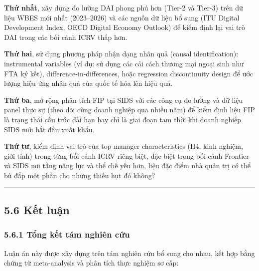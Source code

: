 \documentclass[12pt,a4paper]{article}
\begin{document}
\textbf{Thứ nhất}, xây dựng đo lường DAI phong phú hơn (Tier-2 và
Tier-3) trên dữ liệu WBES mới nhất (2023--2026) và các nguồn dữ liệu bổ
sung (ITU Digital Development Index, OECD Digital Economy Outlook) để
kiểm định lại vai trò DAI trong các bối cảnh ICRV thấp hơn.

\textbf{Thứ hai}, sử dụng phương pháp nhận dạng nhân quả (causal
identification): instrumental variables (ví dụ: sử dụng các cải cách
thương mại ngoại sinh như FTA ký kết), difference-in-differences, hoặc
regression discontinuity design để ước lượng hiệu ứng nhân quả của quốc
tế hóa lên hiệu quả.

\textbf{Thứ ba}, mở rộng phân tích FIP tại SIDS với các công cụ đo lường
và dữ liệu panel thực sự (theo dõi cùng doanh nghiệp qua nhiều năm) để
kiểm định liệu FIP là trạng thái cấu trúc dài hạn hay chỉ là giai đoạn
tạm thời khi doanh nghiệp SIDS mới bắt đầu xuất khẩu.

\textbf{Thứ tư}, kiểm định vai trò của top manager characteristics (H4,
kinh nghiệm, giới tính) trong từng bối cảnh ICRV riêng biệt, đặc biệt
trong bối cảnh Frontier và SIDS nơi tầng năng lực và thể chế yếu hơn,
liệu đặc điểm nhà quản trị có thể bù đắp một phần cho những thiếu hụt đó
không?

\begin{center}\rule{0.5\linewidth}{0.5pt}\end{center}

\hypertarget{56-kux1ebft-luux1eadn}{%
\subsection{5.6 Kết luận}\label{56-kux1ebft-luux1eadn}}

\hypertarget{561-tux1ed5ng-kux1ebft-tuxe1m-nghiuxean-cux1ee9u}{%
\subsubsection{5.6.1 Tổng kết tám nghiên
cứu}\label{561-tux1ed5ng-kux1ebft-tuxe1m-nghiuxean-cux1ee9u}}

Luận án này được xây dựng trên tám nghiên cứu bổ sung cho nhau, kết hợp
bằng chứng từ meta-analysis và phân tích thực nghiệm sơ cấp:
\end{document}
